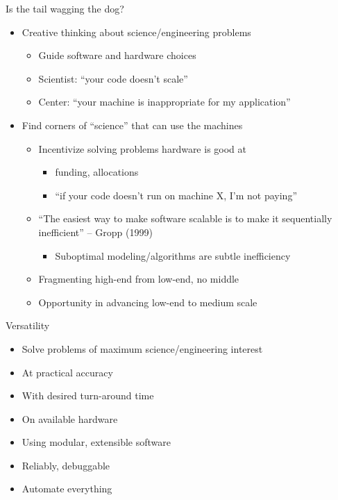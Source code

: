 \documentclass{beamer}
\begin{document}
\begin{frame}{Is the tail wagging the dog?}
  \begin{itemize}
  \item Creative thinking about science/engineering problems
    \begin{itemize}
    \item Guide software and hardware choices
    \item Scientist: ``your code doesn't scale''
    \item Center: ``your machine is inappropriate for my application''
    \end{itemize}
  \item Find corners of ``science'' that can use the machines
    \begin{itemize}
    \item Incentivize solving problems hardware is good at
      \begin{itemize}
      \item funding, allocations
      \item ``if your code doesn't run on machine X, I'm not paying''
      \end{itemize}
    \item ``The easiest way to make software scalable is to make it sequentially inefficient'' -- Gropp (1999)
      \begin{itemize}
      \item Suboptimal modeling/algorithms are subtle inefficiency
      \end{itemize}
    \item Fragmenting high-end from low-end, no middle
    \item Opportunity in advancing low-end to medium scale
    \end{itemize}
  \end{itemize}
\end{frame}

\begin{frame}{Versatility}
  \begin{itemize}
  \item Solve problems of maximum science/engineering interest
  \item At practical accuracy
  \item With desired turn-around time
  \item On available hardware
  \item Using modular, extensible software
  \item Reliably, debuggable
  \item Automate everything
  \end{itemize}
\end{frame}
\end{document}
